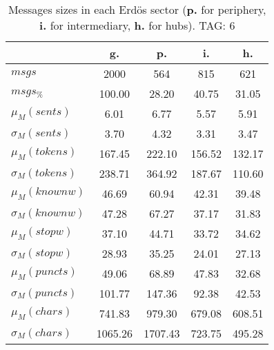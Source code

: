 \begin{table}[h!]
\begin{center}
\begin{tabular}{| l || c | c | c | c |}\hline
 & {\bf g.} & {\bf p.} & {\bf i.} & {\bf h.} \\\hline\hline
$msgs$ & 2000  & 564  & 815  & 621 \\
$msgs_{\%}$ & 100.00  & 28.20  & 40.75  & 31.05 \\\hline
$\mu_M(sents)$ & 6.01  & 6.77  & 5.57  & 5.91 \\
$\sigma_M(sents)$ & 3.70  & 4.32  & 3.31  & 3.47 \\\hline
$\mu_M(tokens)$ & 167.45  & 222.10  & 156.52  & 132.17 \\
$\sigma_M(tokens)$ & 238.71  & 364.92  & 187.67  & 110.60 \\\hline
$\mu_M(knownw)$ & 46.69  & 60.94  & 42.31  & 39.48 \\
$\sigma_M(knownw)$ & 47.28  & 67.27  & 37.17  & 31.83 \\\hline
$\mu_M(stopw)$ & 37.10  & 44.71  & 33.72  & 34.62 \\
$\sigma_M(stopw)$ & 28.93  & 35.25  & 24.01  & 27.13 \\\hline
$\mu_M(puncts)$ & 49.06  & 68.89  & 47.83  & 32.68 \\
$\sigma_M(puncts)$ & 101.77  & 147.36  & 92.38  & 42.53 \\\hline
$\mu_M(chars)$ & 741.83  & 979.30  & 679.08  & 608.51 \\
$\sigma_M(chars)$ & 1065.26  & 1707.43  & 723.75  & 495.28 \\\hline
\end{tabular}
\caption{Messages sizes in each Erd\"os sector ({{\bf p.}} for periphery, {{\bf i.}} for intermediary, {{\bf h.}} for hubs). TAG: 6}
\end{center}
\end{table}